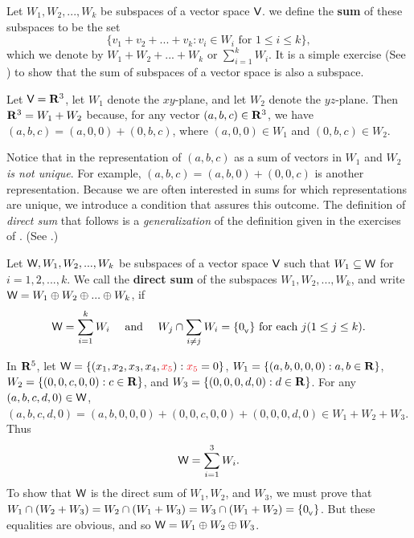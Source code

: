 \begin{definition} \label{def 5.8}
Let \(W_1, W_2, ..., W_k\) be subspaces of a vector space \(\textsf{V}\). we define the \textbf{sum} of these subspaces to be the set
\[
    \{ v_1 + v_2 + ... + v_k : v_i \in W_i \text{ for } 1 \le i \le k \},
\]
which we denote by \(W_1 + W_2 + ... + W_k\) or \(\sum_{i = 1}^k W_i\).
It is a simple exercise (See ) to show that the sum of subspaces of a vector space is also a subspace.
\end{definition}

\begin{example} \label{example 5.2.8}
Let \(\textsf{V} = \mathbf{R}^3\), let \(W_1\) denote the \(xy\)-plane, and let \(W_2\) denote the \(yz\)-plane.
Then \(\mathbf{R}^3 = W_1 + W_2\) because, for any vector \((a, b, c) \in \mathbf{R}^3\),
we have \((a, b, c) = (a, 0, 0) + (0, b, c)\), where \((a, 0, 0) \in W_1\) and \((0, b, c) \in W_2\).
\end{example}

Notice that in  the representation of \((a, b, c)\) as a sum of vectors in \(W_1\) and \(W_2\) \emph{is not unique}.
For example, \((a, b, c) = (a, b, 0) + (0, 0, c)\) is
another representation.
Because we are often interested in sums for which representations are unique, we introduce a condition that assures this outcome.
The definition of \emph{direct sum} that follows is a \emph{generalization} of the definition given in the exercises of .
(See .)

\begin{definition} \label{def 5.9}
Let \(\textsf{W}, W_1, W_2, ..., W_k\) be subspaces of a vector space \(\textsf{V}\) such that \(W_1 \subseteq \textsf{W}\) for \(i = 1, 2, ..., k\).
We call \W the \textbf{direct sum} of the subspaces \(W_1, W_2, ..., W_k\), and write \(\textsf{W} = W_1 \oplus W_2 \oplus ... \oplus W_k\), if
\[
    \textsf{W} = \sum_{i = 1}^k W_i \quad \text{ and } \quad W_j \cap \sum_{i \ne j} W_i = \{ 0_{_{\textsf{V}}} \} \text{ for each } j (1 \le j \le k).
\]
\end{definition}

\begin{example} \label{example 5.2.9}
In \(\mathbf{R}^5\), let \(\W = \{(x_1, x_2, x_3, x_4, \RED{x_5}) : \RED{x_5} = 0 \}\),
\(W_1 = \{(a, b, 0, 0, 0): a, b \in \mathbf{R} \}\), \(W_2 = \{ (0, 0, c, 0, 0): c \in \mathbf{R}\}\),
and \(W_3 = \{(0, 0, 0, d, 0): d \in \mathbf{R} \}\).
For any \((a, b, c, d, 0) \in \textsf{W}\),
\((a, b, c, d, 0) = (a, b, 0, 0, 0) + (0, 0, c, 0, 0) + (0, 0, 0, d, 0) \in W_1 + W_2 + W_3\).
Thus
\[
    \textsf{W} = \sum_{i = 1}^3 W_i.
\]
To show that \(\textsf{W}\) is the direct sum of \(W_1, W_2\), and \(W_3\), we must prove that \(W_1 \cap (W_2 + W_3) = W_2 \cap (W_1 + W_3) = W_3 \cap (W_1 + W_2) = \{ 0_{_{\textsf{V}}} \}\).
But these equalities are obvious, and so \(\textsf{W} = W_1 \oplus W_2 \oplus W_3\).
\end{example}

